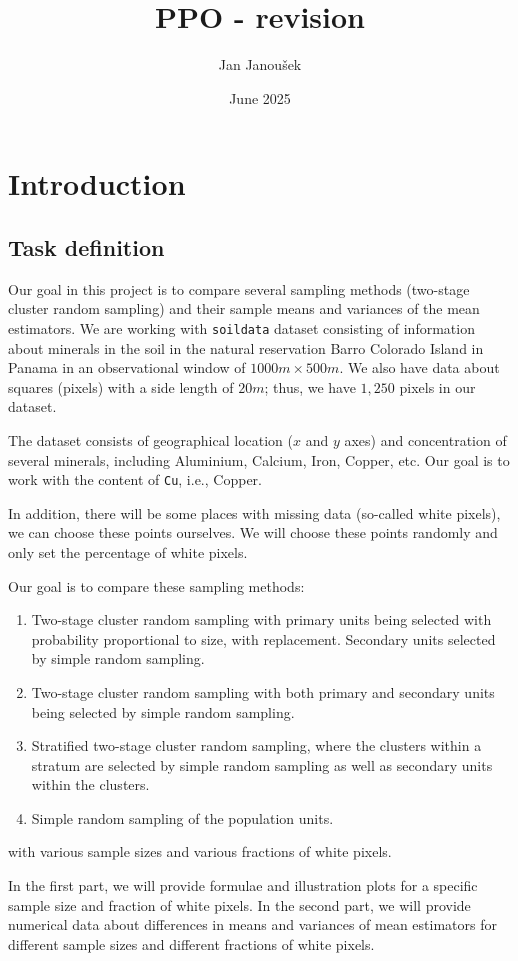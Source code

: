 \documentclass{article}
\title{PPO - revision}
\author{Jan Janoušek}
\date{June 2025}
\begin{document}
\maketitle

\section{Introduction}
\subsection{Task definition}
Our goal in this project is to compare several sampling methods (two-stage cluster random sampling) and their sample means and variances of the mean estimators. We are working with \texttt{soildata} dataset consisting of information about minerals in the soil in the natural reservation Barro Colorado Island in Panama in an observational window of $1000m \times 500 m$. We also have data about squares (pixels) with a side length of $ 20 m$; thus, we have $1,250$ pixels in our dataset.


The dataset consists of geographical location ($x$ and $y$ axes) and concentration of several minerals, including Aluminium, Calcium, Iron, Copper, etc. Our goal is to work with the content of \texttt{Cu}, i.e., Copper.

In addition, there will be some places with missing data (so-called white pixels), we can choose these points ourselves. We will choose these points randomly and only set the percentage of white pixels.

Our goal is to compare these sampling methods:
\begin{enumerate}
    \item Two-stage cluster random sampling with primary units being selected with probability proportional to size, with replacement. Secondary units selected by simple random sampling.
    \item Two-stage cluster random sampling with both primary and secondary units being selected by simple random sampling.
    \item Stratified two-stage cluster random sampling, where the clusters within a stratum are selected by simple random sampling as well as secondary units within the clusters.
    \item Simple random sampling of the population units.
\end{enumerate}
with various sample sizes and various fractions of white pixels.

In the first part, we will provide formulae and illustration plots for a specific sample size and fraction of white pixels. In the second part, we will provide numerical data about differences in means and variances of mean estimators for different sample sizes and different fractions of white pixels.
\end{document}
